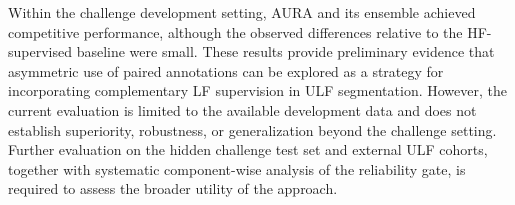 \documentclass[runningheads]{llncs}
\begin{document}
Within the challenge development setting, AURA and its ensemble achieved competitive performance, although the observed differences relative to the HF-supervised baseline were small. These results provide preliminary evidence that asymmetric use of paired annotations can be explored as a strategy for incorporating complementary LF supervision in ULF segmentation. However, the current evaluation is limited to the available development data and does not establish superiority, robustness, or generalization beyond the challenge setting. Further evaluation on the hidden challenge test set and external ULF cohorts, together with systematic component-wise analysis of the reliability gate, is required to assess the broader utility of the approach.





\end{document}

